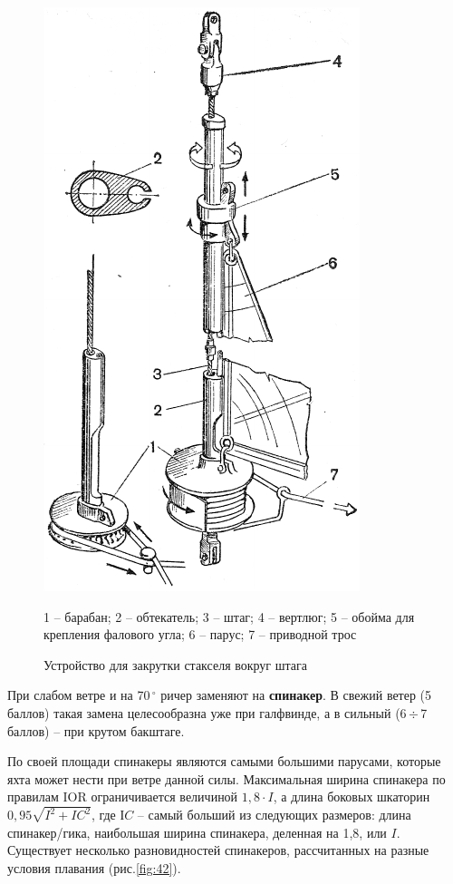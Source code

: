 \documentclass[a4paper, 12pt, twoside, final, book, russian, fittopage, cyremdash]{ncc}
\newcommand{\gr}{\ensuremath{\,^\circ}\xspace}
\newcommand{\otdo}{\,\ensuremath{\div}\,}
\newcommand{\ris}[1]{\ref{fig:#1}}
\begin{document}
\begin{figure}[htb]
  \centering{}
  \includegraphics[scale=1.2]{0046P}
  \caption{Устройство для закрутки стакселя вокруг штага}
  \label{fig:46}
  \small
  1 \--- барабан; 2 \--- обтекатель; 3 \--- штаг; 4 \--- вертлюг; 5 \--- обойма для крепления фалового угла; 6 \--- парус; 7 \--- приводной трос
\end{figure}

При слабом ветре и на 70\gr ричер заменяют на \textbf{спинакер}. В свежий ветер (5 баллов) такая замена целесообразна уже при галфвинде, а в сильный (6\otdo 7 баллов) \--- при крутом бакштаге. 

По своей площади спинакеры являются самыми большими парусами, которые яхта может нести при ветре данной силы. Максимальная ширина спинакера по правилам IOR ограничивается величиной $1,8 \cdot I$, а длина боковых шкаторин $0,95 \sqrt{I^2 + IC^2}$, где $ІC$ \--- самый больший из следующих размеров: длина спинакер\-/гика, наибольшая ширина спинакера, деленная на 1,8, или $I$. Существует несколько разновидностей спинакеров, рассчитанных на разные условия плавания (рис.\ris{42}). 
\end{document}
